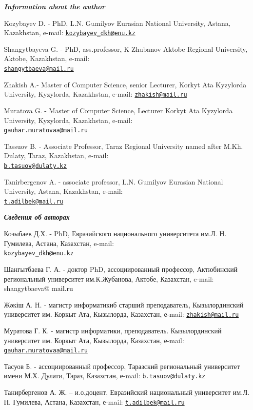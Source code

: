 \begin{authorinfo}
\emph{{\bfseries Information about the author}}

Kozybayev D. - PhD, L.N. Gumilyov Eurasian National University, Astana,
Kazakhstan, e-mail:
\href{mailto:kozybayev_dkh@enu.kz}{\nolinkurl{kozybayev\_dkh@enu.kz}}

Shangytbayeva G. - PhD, ass.professor, K Zhubanov Aktobe Regional
University, Aktobe, Kazakhstan, e-mail:\\
\href{mailto:shangytbaeva@mail.ru}{\nolinkurl{shangytbaeva@mail.ru}}

Zhakish A.- Master of Computer Science, senior Lecturer, Korkyt
Ata Kyzylorda University, Kyzylorda, Kazakhstan, e-mail:
\href{mailto:zhakish@mail.ru}{\nolinkurl{zhakish@mail.ru}}

Muratova G. - Master of Computer Science, Lecturer Korkyt Ata Kyzylorda
University, Kyzylorda, Kazakhstan, e-mail:\\
\href{mailto:gauhar.muratovaa@mail.ru}{\nolinkurl{gauhar.muratovaa@mail.ru}}

Tassuov B. - Associate Professor, Taraz Regional University named after
M.Kh. Dulaty, Taraz, Kazakhstan, e-mail:\\
\href{mailto:b.tasuov@dulaty.kz}{\nolinkurl{b.tasuov@dulaty.kz}}

Tanirbergenov A. - associate professor, L.N. Gumilyov Eurasian National
University, Astana, Kazakhstan, e-mail:\\
\href{mailto:t.adilbek@mail.ru}{\nolinkurl{t.adilbek@mail.ru}}

\emph{{\bfseries Сведения об авторах}}

Козыбаев Д.Х. - PhD, Евразийского национального университета
им.Л. Н. Гумилева, Астана, Казахстан, e-mail:\\
\href{mailto:kozybayev_dkh@enu.kz}{\nolinkurl{kozybayev\_dkh@enu.kz}}

Шангытбаева Г. А. - доктор PhD, ассоциированный профессор,
Актюбинский региональный университет им.К.Жубанова, Актобе, Казахстан,
e-mail: shangytbaeva@ mail.ru

Жәкіш А. Н. - магистр информатикиб старший преподаватель,
Кызылординский университет им. Коркыт Ата, Кызылорда, Казахстан, е-mail:
\href{mailto:zhakish@mail.ru}{\nolinkurl{zhakish@mail.ru}}

Муратова Г. К. - магистр информатики, преподаватель.
Кызылординский университет им. Коркыт Ата, Кызылорда, Казахстан,
е-mail:
\href{mailto:gauhar.muratovaa@mail.ru}{\nolinkurl{gauhar.muratovaa@mail.ru}}

Тасуов Б. - ассоциированный профессор, Таразский региональный
университет имени М.Х. Дулати, Тараз, Казахстан, е-mail:
\href{mailto:b.tasuov@dulaty.kz}{\nolinkurl{b.tasuov@dulaty.kz}}

Танирбергенов А. Ж. -- и.о.доцент, Евразийский национальный университет
им.Л. Н. Гумилева, Астана, Казахстан, е-mail:
\href{mailto:t.adilbek@mail.ru}{\nolinkurl{t.adilbek@mail.ru}}
\end{authorinfo}
